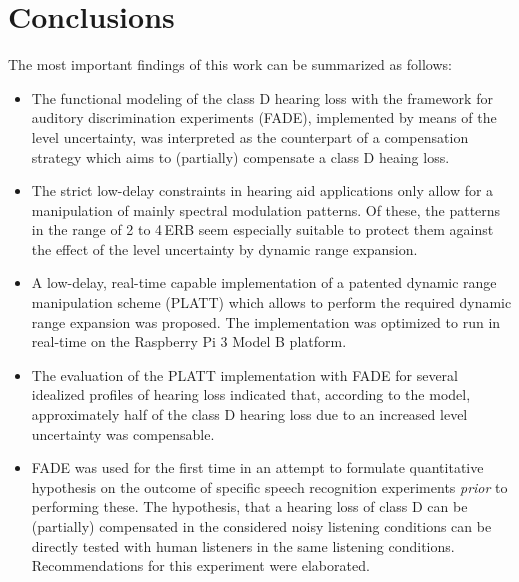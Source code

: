 \documentclass[10pt,a4paper,twocolumn]{article}
\begin{document}
\section*{Conclusions}
\label{sec:conclusion}
The most important findings of this work can be summarized as follows:
\begin{itemize}
	\item The functional modeling of the class D hearing loss with the framework for auditory discrimination experiments (FADE), implemented by means of the level uncertainty, was interpreted as the counterpart of a compensation strategy which aims to (partially) compensate a class D heaing loss.
	\item The strict low-delay constraints in hearing aid applications only allow for a manipulation of mainly spectral modulation patterns. Of these, the patterns in the range of 2 to 4\,ERB seem especially suitable to protect them against the effect of the level uncertainty by dynamic range expansion.
	\item A low-delay, real-time capable implementation of a patented dynamic range manipulation scheme (PLATT) which allows to perform the required dynamic range expansion was proposed. The implementation was optimized to run in real-time on the Raspberry Pi 3 Model B platform.
	\item The evaluation of the PLATT implementation with FADE for several idealized profiles of hearing loss indicated that, according to the model, approximately half of the class D hearing loss due to an increased level uncertainty was compensable.
	\item FADE was used for the first time in an attempt to formulate quantitative hypothesis on the outcome of specific speech recognition experiments \emph{prior} to performing these. The hypothesis, that a hearing loss of class D can be (partially) compensated in the considered noisy listening conditions can be directly tested with human listeners in the same listening conditions. Recommendations for this experiment were elaborated.
\end{itemize}


\end{document}
